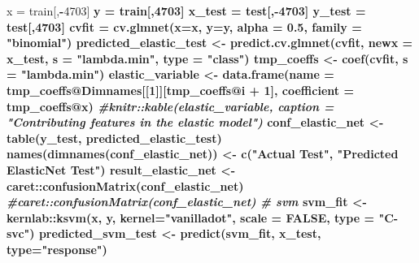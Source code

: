 \documentclass[]{article}
\newenvironment{Shaded}{\begin{snugshade}}{\end{snugshade}}
\newcommand{\KeywordTok}[1]{\textcolor[rgb]{0.13,0.29,0.53}{\textbf{#1}}}
\newcommand{\DataTypeTok}[1]{\textcolor[rgb]{0.13,0.29,0.53}{#1}}
\newcommand{\DecValTok}[1]{\textcolor[rgb]{0.00,0.00,0.81}{#1}}
\newcommand{\FloatTok}[1]{\textcolor[rgb]{0.00,0.00,0.81}{#1}}
\newcommand{\StringTok}[1]{\textcolor[rgb]{0.31,0.60,0.02}{#1}}
\newcommand{\CommentTok}[1]{\textcolor[rgb]{0.56,0.35,0.01}{\textit{#1}}}
\newcommand{\OtherTok}[1]{\textcolor[rgb]{0.56,0.35,0.01}{#1}}
\newcommand{\OperatorTok}[1]{\textcolor[rgb]{0.81,0.36,0.00}{\textbf{#1}}}
\newcommand{\NormalTok}[1]{#1}
\begin{document}
\begin{Shaded}
\begin{Highlighting}[]
\NormalTok{x =}\StringTok{ }\NormalTok{train[,}\OperatorTok{-}\DecValTok{4703}\NormalTok{] }\OperatorTok{%>%}\StringTok{ }\KeywordTok{as.matrix}\NormalTok{()}
\NormalTok{y =}\StringTok{ }\NormalTok{train[,}\DecValTok{4703}\NormalTok{]}
\NormalTok{x_test =}\StringTok{ }\NormalTok{test[,}\OperatorTok{-}\DecValTok{4703}\NormalTok{] }\OperatorTok{%>%}\StringTok{ }\KeywordTok{as.matrix}\NormalTok{()}
\NormalTok{y_test =}\StringTok{ }\NormalTok{test[,}\DecValTok{4703}\NormalTok{]}
\NormalTok{cvfit =}\StringTok{ }\KeywordTok{cv.glmnet}\NormalTok{(}\DataTypeTok{x=}\NormalTok{x, }\DataTypeTok{y=}\NormalTok{y, }\DataTypeTok{alpha =} \FloatTok{0.5}\NormalTok{, }\DataTypeTok{family =}   \StringTok{"binomial"}\NormalTok{)}
\NormalTok{predicted_elastic_test <-}\StringTok{ }\KeywordTok{predict.cv.glmnet}\NormalTok{(cvfit, }\DataTypeTok{newx =}\NormalTok{ x_test, }\DataTypeTok{s =} \StringTok{"lambda.min"}\NormalTok{, }\DataTypeTok{type =} \StringTok{"class"}\NormalTok{)}
\NormalTok{tmp_coeffs <-}\StringTok{ }\KeywordTok{coef}\NormalTok{(cvfit, }\DataTypeTok{s =} \StringTok{"lambda.min"}\NormalTok{)}
\NormalTok{elastic_variable <-}\StringTok{ }\KeywordTok{data.frame}\NormalTok{(}\DataTypeTok{name =}\NormalTok{ tmp_coeffs}\OperatorTok{@}\NormalTok{Dimnames[[}\DecValTok{1}\NormalTok{]][tmp_coeffs}\OperatorTok{@}\NormalTok{i }\OperatorTok{+}\StringTok{ }\DecValTok{1}\NormalTok{], }\DataTypeTok{coefficient =}\NormalTok{ tmp_coeffs}\OperatorTok{@}\NormalTok{x)}
\CommentTok{#knitr::kable(elastic_variable, caption = "Contributing features in the elastic model")}
\NormalTok{conf_elastic_net <-}\StringTok{ }\KeywordTok{table}\NormalTok{(y_test, predicted_elastic_test)}
\KeywordTok{names}\NormalTok{(}\KeywordTok{dimnames}\NormalTok{(conf_elastic_net)) <-}\StringTok{ }\KeywordTok{c}\NormalTok{(}\StringTok{"Actual Test"}\NormalTok{, }\StringTok{"Predicted ElasticNet Test"}\NormalTok{)}
\NormalTok{result_elastic_net <-}\StringTok{ }\NormalTok{caret}\OperatorTok{::}\KeywordTok{confusionMatrix}\NormalTok{(conf_elastic_net)}
\CommentTok{#caret::confusionMatrix(conf_elastic_net)}
\CommentTok{# svm}
\NormalTok{svm_fit <-}\StringTok{ }\NormalTok{kernlab}\OperatorTok{::}\KeywordTok{ksvm}\NormalTok{(x, y, }\DataTypeTok{kernel=}\StringTok{"vanilladot"}\NormalTok{, }\DataTypeTok{scale =} \OtherTok{FALSE}\NormalTok{, }\DataTypeTok{type =} \StringTok{"C-svc"}\NormalTok{)}
\NormalTok{predicted_svm_test <-}\StringTok{ }\KeywordTok{predict}\NormalTok{(svm_fit, x_test, }\DataTypeTok{type=}\StringTok{"response"}\NormalTok{)}
}}
\end{Highlighting}
\end{Shaded}
\end{document}
